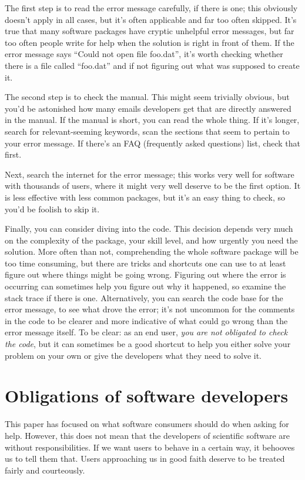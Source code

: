 \documentclass[9pt,training]{livecoms}
\begin{document}
The first step is to read the error message carefully, if there is one; this
obviously doesn't apply in all cases, but it's often applicable and far too
often skipped. It's true that many software packages have cryptic unhelpful
error messages, but far too often people write for help when the solution is
right in front of them. If the error message says ``Could not open file
foo.dat'', it's worth checking whether there is a file called ``foo.dat'' and if
not figuring out what was supposed to create it.

The second step is to check the manual. This might seem trivially obvious, but
you'd be astonished how many emails developers get that are directly answered in
the manual. If the manual is short, you can read the whole thing. If it's
longer, search for relevant-seeming keywords, scan the sections that seem to
pertain to your error message. If there's an FAQ (frequently asked questions)
list, check that first.

Next, search the internet for the error message; this works very well for
software with thousands of users, where it might very well deserve to be the
first option. It is less effective with less common packages, but it's an easy
thing to check, so you'd be foolish to skip it.

Finally, you can consider diving into the code. This decision depends very much
on the complexity of the package, your skill level, and how urgently you need
the solution. More often than not, comprehending the whole software package will
be too time consuming, but there are tricks and shortcuts one can use to at
least figure out where things might be going wrong. Figuring out where the error
is occurring can sometimes help you figure out why it happened, so examine the
stack trace if there is one. Alternatively, you can search the code base for the
error message, to see what drove the error; it's not uncommon for the comments
in the code to be clearer and more indicative of what could go wrong than the
error message itself. To be clear: as an end user, \emph{you are not obligated
to check the code}, but it can sometimes be a good shortcut to help you either
solve your problem on your own or give the developers what they need to solve
it.

\section{Obligations of software developers}

This paper has focused on what software consumers should do when asking for
help.  However, this does not mean that the developers of scientific software
are without responsibilities. If we want users to behave in a certain way, it
behooves us to tell them that. Users approaching us in good faith deserve to be
treated fairly and courteously.
\end{document}
